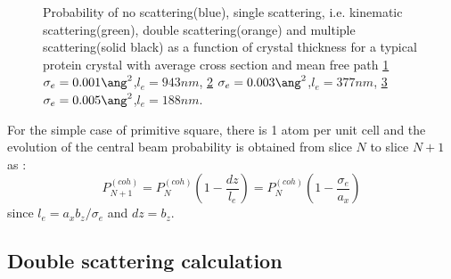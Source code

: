 \documentclass[a4paper,10pt]{article}
\newcommand{\path}{../../../mygit/_Latex/}
\begin{document}
  \begin{figure}[h!]
  	\begin{subfigure}{0.32\textwidth}
  		\centering
      \def\svgwidth{\columnwidth}
  		
  		\caption{}\label{fig:Pcoh_kin_dual_dyn0}
  	\end{subfigure}
  	\begin{subfigure}{0.32\textwidth}
  		\centering
      \def\svgwidth{\columnwidth}
  		
  		\caption{}\label{fig:Pcoh_kin_dual_dyn1}
  	\end{subfigure}
    \begin{subfigure}{0.32\textwidth}
  		\centering
      \def\svgwidth{\columnwidth}
  		
  		\caption{}\label{fig:Pcoh_kin_dual_dyn2}
  	\end{subfigure}

  	\caption[protein multiple scattering and mean free path]{
    Probability of no scattering(blue), single scattering, i.e. kinematic scattering(green), double scattering(orange) and multiple scattering(solid black) as a function of crystal thickness for a typical protein crystal with average cross section and mean free path
  		\ref{fig:Pcoh_kin_dual_dyn0} $\sigma_e=0.001\ang^2$,$l_e=943nm$,
  		\ref{fig:Pcoh_kin_dual_dyn1} $\sigma_e=0.003\ang^2$,$l_e=377nm$,
  		\ref{fig:Pcoh_kin_dual_dyn2} $\sigma_e=0.005\ang^2$,$l_e=188nm$.
  	}\label{fig:Pcoh_kin_dual_dyn}
  \end{figure}


For the simple case of primitive square, there is 1 atom per unit cell and the evolution of the central beam probability is obtained from slice $N$ to slice $N+1$ as :
\begin{equation}
  P^{(coh)}_{N+1} =
    P^{(coh)}_{N}\left(1-\frac{dz}{l_e}\right) =
    P^{(coh)}_{N}\left(1-\frac{\sigma_e}{a_x}\right)
\end{equation}
since $l_e=a_xb_z/\sigma_e$ and $dz=b_z$.



\subsection{Double scattering calculation}




\newpage


\end{document}
